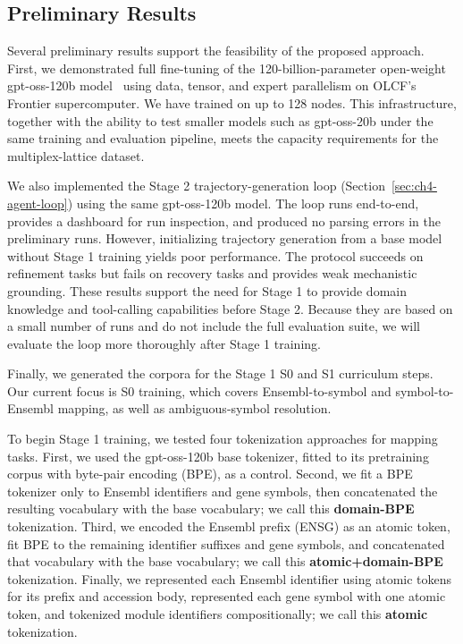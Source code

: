 \subsection{Preliminary Results}\label{sec:ch4-prelim}
Several preliminary results support the feasibility of the proposed approach. First, we demonstrated full fine-tuning of the 120-billion-parameter open-weight gpt-oss-120b model~\cite{gpt-oss} using data, tensor, and expert parallelism on OLCF's Frontier supercomputer. We have trained on up to 128 nodes. This infrastructure, together with the ability to test smaller models such as gpt-oss-20b under the same training and evaluation pipeline, meets the capacity requirements for the multiplex-lattice dataset.

We also implemented the Stage 2 trajectory-generation loop (Section~\ref{sec:ch4-agent-loop}) using the same gpt-oss-120b model. The loop runs end-to-end, provides a dashboard for run inspection, and produced no parsing errors in the preliminary runs. However, initializing trajectory generation from a base model without Stage 1 training yields poor performance. The protocol succeeds on refinement tasks but fails on recovery tasks and provides weak mechanistic grounding. These results support the need for Stage 1 to provide domain knowledge and tool-calling capabilities before Stage 2. Because they are based on a small number of runs and do not include the full evaluation suite, we will evaluate the loop more thoroughly after Stage 1 training.

Finally, we generated the corpora for the Stage 1 S0 and S1 curriculum steps. Our current focus is S0 training, which covers Ensembl-to-symbol and symbol-to-Ensembl mapping, as well as ambiguous-symbol resolution.

To begin Stage 1 training, we tested four tokenization approaches for mapping tasks. First, we used the gpt-oss-120b base tokenizer, fitted to its pretraining corpus with byte-pair encoding (BPE), as a control. Second, we fit a BPE tokenizer only to Ensembl identifiers and gene symbols, then concatenated the resulting vocabulary with the base vocabulary; we call this \textbf{domain-BPE} tokenization. Third, we encoded the Ensembl prefix (ENSG) as an atomic token, fit BPE to the remaining identifier suffixes and gene symbols, and concatenated that vocabulary with the base vocabulary; we call this \textbf{atomic+domain-BPE} tokenization. Finally, we represented each Ensembl identifier using atomic tokens for its prefix and accession body, represented each gene symbol with one atomic token, and tokenized module identifiers compositionally; we call this \textbf{atomic} tokenization.

